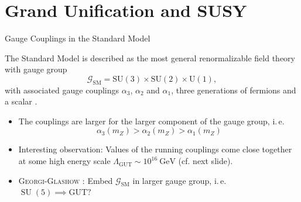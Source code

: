 \section{Grand Unification and SUSY}

\begin{frame}{Gauge Couplings in the Standard Model}
\addtocounter{framenumber}{-1}
The Standard Model is described as the most general renormalizable 	field theory with gauge group 
\begin{equation*}
	\mathcal{G}_{\mathrm{SM}} = \mathrm{SU}(3) \times \mathrm{SU}(2) \times \mathrm{U}(1),
\end{equation*}
with  associated gauge couplings $\alpha_3$, $\alpha_2$ and $\alpha_1$,
three generations of fermions and a scalar \cite{Hebecker2020}. \\[2em]
\begin{itemize}
\item The couplings are larger for the larger component of the gauge group, i.\,e. \begin{equation*}
	\alpha_3(m_Z) > \alpha_2(m_Z) > \alpha_1(m_Z)
	\end{equation*}
	\item Interesting observation: Values of the running couplings come close together at some high energy scale $\Lambda_{\mathrm{GUT}} \sim 10^{16}\ \mathrm{GeV}$ (cf. next slide).\\[1em]
	\item \alert{\textsc{Georgi-Glashow}} \cite{GeorgiGlashow1974}: Embed $\mathcal{G}_{\mathrm{SM}}$ in larger gauge group, i.\,e. $\operatorname{SU}(5) \implies \mathrm{GUT?}$  
 \end{itemize}
 \end{frame}

